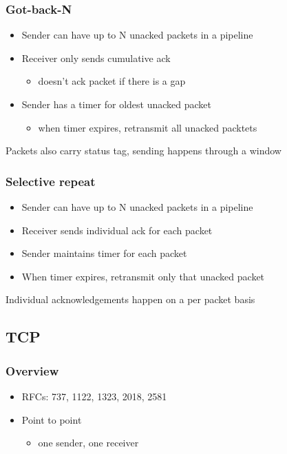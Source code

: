 \documentclass[11pt]{article}
\begin{document}
\subsubsection{Got-back-N}
\label{sec:org2d28d9a}
\begin{itemize}
\item Sender can have up to N unacked packets in a pipeline
\item Receiver only sends cumulative ack
\begin{itemize}
\item doesn't ack packet if there is a gap
\end{itemize}
\item Sender has a timer for oldest unacked packet
\begin{itemize}
\item when timer expires, retransmit all unacked packtets
\end{itemize}
\end{itemize}

Packets also carry status tag, sending happens through a window

\subsubsection{Selective repeat}
\label{sec:org9fb42cb}
\begin{itemize}
\item Sender can have up to N unacked packets in a pipeline
\item Receiver sends individual ack for each packet
\item Sender maintains timer for each packet
\item When timer expires, retransmit only that unacked packet
\end{itemize}


Individual acknowledgements happen on a per packet basis

\subsection{TCP}
\label{sec:orgdb60aa9}
\subsubsection{Overview}
\label{sec:orge0ce225}
\begin{itemize}
\item RFCs: 737, 1122, 1323, 2018, 2581
\item Point to point
\begin{itemize}
\item one sender, one receiver
\end{itemize}
\end{itemize}
\end{document}

